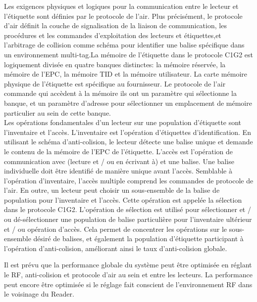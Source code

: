 \documentclass[11pt, a4paper, twoside]{book}
\begin{document}
Les exigences physiques et logiques pour la communication entre le lecteur et l'étiquette  sont définies par le protocole de l'air. Plus précisément, le protocole d'air définit la couche de signalisation de la liaison de communication, les procédures et les commandes d'exploitation des lecteurs et étiquettes,et l'arbitrage de collision comme schéma pour identifier une balise spécifique  dans un environnement multi-tag.La mémoire de l'étiquette dans le protocole C1G2 est logiquement  divisée en quatre banques distinctes: la mémoire réservée, la mémoire de l'EPC, la mémoire TID et la mémoire utilisateur. La carte mémoire physique de l'étiquette est spécifique au fournisseur. Le protocole de l'air commande qui accèdent à la mémoire ils ont un paramètre qui sélectionne la banque, et un paramètre d'adresse pour sélectionner un emplacement de mémoire particulier au sein de cette banque.\\


Les opérations fondamentales d'un lecteur sur une population d'étiquette sont l'inventaire et l'accès. L'inventaire est l'opération d'étiquettes d'identification. En utilisant le schéma d'anti-colision, le lecteur détecte une balise unique et demande le contenu de la mémoire de l'EPC de l'étiquette. L'accès est l'opération de  communication avec (lecture et / ou en écrivant à) et une balise. Une balise individuelle doit être identifié de manière unique avant l'accès. Semblable à l'opération d'inventaire, l'accès multiple comprend les commandes de protocole de l'air. En outre, un lecteur peut choisir un sous-ensemble de la balise de population pour l'inventaire et l'accès. Cette opération est appelée la sélection dans le protocole C1G2. L'opération de sélection est utilisé pour sélectionner et / ou dé-sélectionner une population de balise particulière pour l'inventaire ultérieur et / ou opération d'accès. Cela permet de concentrer les opérations sur le sous-ensemble désiré de balises, et également la population d'étiquette participant à l'opération  d'anti-colision, améliorant ainsi le taux d'anti-colision globale.

Il est prévu que la performance globale du système peut être optimisée en réglant le RF, anti-colision et protocole d'air  au sein et entre les lecteurs. La performance peut encore être optimisée si le réglage fait conscient de l'environnement RF dans le voisinage du Reader.\\
\end{document}

